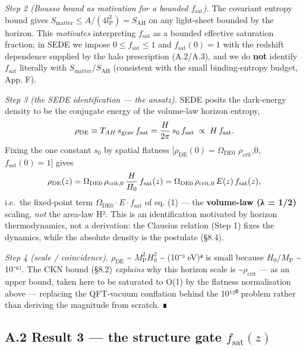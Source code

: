 \documentclass[
  10pt,
]{article}
\begin{document}
\emph{Step 2 (Bousso bound as motivation for a bounded
\(f_{\mathrm{sat}}\)).} The covariant entropy bound gives
\(S_{\mathrm{matter}} \leq  A/(4l_{\mathrm{P}}^{2}) = S_{\mathrm{AH}}\)
on any light-sheet bounded by the horizon. This \emph{motivates}
interpreting \(f_{\mathrm{sat}}\) as a bounded effective saturation
fraction; in SEDE we impose \(0 \leq  f_{\mathrm{sat}} \leq  1\) and
\(f_{\mathrm{sat}}(0) = 1\) with the redshift dependence supplied by the
halo prescription (A.2/A.3), and we do \textbf{not} identify
\(f_{\mathrm{sat}}\) literally with
\(S_{\mathrm{matter}}/S_{\mathrm{AH}}\) (consistent with the small
binding-entropy budget, App. F).

\emph{Step 3 (the SEDE identification --- the ansatz).} SEDE posits the
dark-energy density to be the conjugate energy of the volume-law horizon
entropy,
\[\rho_{\rm DE} \equiv T_{AH}\,s_{\rm grav}\,f_{\rm sat} = \frac{H}{2\pi}\,s_0\,f_{\rm sat} \;\propto\; H\,f_{\rm sat}.\]
Fixing the one constant \(s_{0}\) by spatial flatness
\([\rho _{\mathrm{DE}}(0) = \Omega _{\mathrm{DE0}}\)
\(\rho _{\mathrm{crit}}\),0, \(f_{\mathrm{sat}}(0) = 1\){]} gives
\[\rho_{\rm DE}(z) = \Omega_{\rm DE0}\,\rho_{\rm crit,0}\,\frac{H}{H_0}\,f_{\rm sat}(z)
= \Omega_{\rm DE0}\,\rho_{\rm crit,0}\,E(z)\,f_{\rm sat}(z),\] i.e.~the
fixed-point term \(\Omega _{\mathrm{DE0}}\cdot E\cdot f_{\mathrm{sat}}\)
of eq. (1) --- the \textbf{volume-law (λ = 1/2)} scaling, \emph{not} the
area-law H². This is an identification motivated by horizon
thermodynamics, not a derivation: the Clausius relation (Step 1) fixes
the dynamics, while the absolute density is the postulate (§8.4).

\emph{Step 4 (scale / coincidence).} \(\rho _{\mathrm{DE}}\)
\textasciitilde{} \(M_{\mathrm{P}}^{2}H_{0}^{2}\) \textasciitilde{}
(10⁻³ eV)⁴ is small because \(H_{0}/M_{\mathrm{P}}\) \textasciitilde{}
10⁻⁶¹. The CKN bound (§8.2) \emph{explains} why this horizon scale is
\textasciitilde{}\(\rho _{\mathrm{crit}}\) --- as an upper bound, taken
here to be saturated to O(1) by the flatness normalisation above ---
replacing the QFT-vacuum conflation behind the 10¹²⁰ problem rather than
deriving the magnitude from scratch. ∎

\subsection{\texorpdfstring{A.2 Result 3 --- the structure gate
\(f_{\mathrm{sat}}(z)\)}{A.2 Result 3 --- the structure gate f\_\{\textbackslash mathrm\{sat\}\}(z)}}\label{a.2-result-3-the-structure-gate-f_mathrmsatz}
\end{document}
